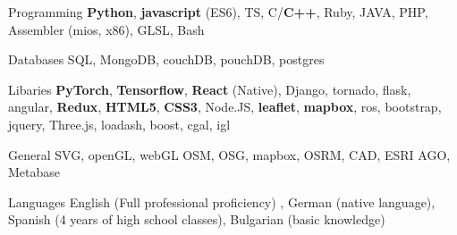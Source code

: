 

\begin{cvskills}

  \cvskill
    {Programming} %
    {\textbf{Python}, \textbf{javascript} (ES6), TS, C/\textbf{C++}, Ruby, JAVA, PHP, Assembler (mios, x86), GLSL, Bash} %

  \cvskill
    {Databases} %
    {SQL, MongoDB, couchDB, pouchDB, postgres} %

  \cvskill
    {Libaries} %
    {\textbf{PyTorch}, \textbf{Tensorflow}, \textbf{React} (Native), Django, tornado, flask, angular, \textbf{Redux}, \textbf{HTML5}, \textbf{CSS3}, Node.JS, \textbf{leaflet}, \textbf{mapbox}, ros, bootstrap, jquery, Three.js, loadash,  boost, cgal, igl} %


  \cvskill
    {General} %
    {SVG, openGL, webGL OSM, OSG, mapbox, OSRM, CAD, ESRI AGO, Metabase} %

  \cvskill
    {Languages} %
    {English (Full professional proficiency) , German (native language), Spanish (4 years of high school classes), Bulgarian (basic knowledge)} %

\end{cvskills}
